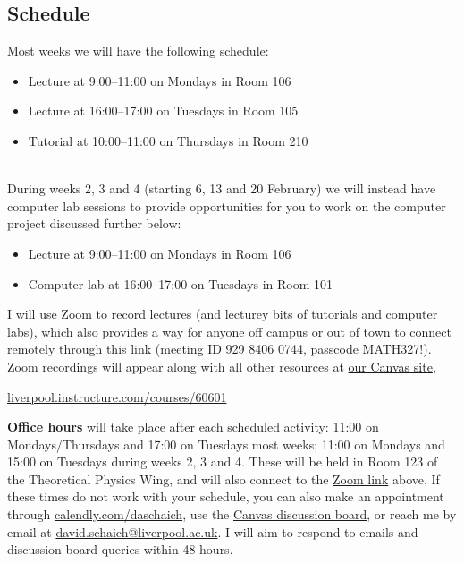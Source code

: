 \subsection*{Schedule}
Most weeks we will have the following schedule: \\[-30 pt]
\begin{itemize}
  \setlength{\itemsep}{1pt}
  \setlength{\parskip}{0pt}
  \setlength{\parsep}{0pt}
  \item Lecture at 9:00--11:00 on Mondays in Room 106
  \item Lecture at 16:00--17:00 on Tuesdays in Room 105
  \item Tutorial at 10:00–11:00 on Thursdays in Room 210
\end{itemize}
\ \\[-30 pt]
During weeks 2, 3 and 4 (starting 6, 13 and 20 February) we will instead have computer lab sessions to provide opportunities for you to work on the computer project discussed further below: \\[-30 pt]
\begin{itemize}
  \setlength{\itemsep}{1pt}
  \setlength{\parskip}{0pt}
  \setlength{\parsep}{0pt}
  \item Lecture at 9:00--11:00 on Mondays in Room 106
  \item Computer lab at 16:00--17:00 on Tuesdays in Room 101
\end{itemize}

I will use Zoom to record lectures (and lecturey bits of tutorials and computer labs), which also provides a way for anyone off campus or out of town to connect remotely through \href{https://liverpool-ac-uk.zoom.us/j/92984060744?pwd=WkVPek8ySlVGVmZVQXJSL21HTTd2Zz09}{this link} (meeting ID 929 8406 0744, passcode MATH327!).
Zoom recordings will appear along with all other resources at \href{https://liverpool.instructure.com/courses/60601}{our Canvas site}, \\
\centerline{\href{https://liverpool.instructure.com/courses/60601}{liverpool.instructure.com/courses/60601}}

\textbf{Office hours} will take place after each scheduled activity: 11:00 on Mondays/Thursdays and 17:00 on Tuesdays most weeks; 11:00 on Mondays and 15:00 on Tuesdays during weeks 2, 3 and 4.
These will be held in Room 123 of the Theoretical Physics Wing, and will also connect to the \href{https://liverpool-ac-uk.zoom.us/j/92984060744?pwd=WkVPek8ySlVGVmZVQXJSL21HTTd2Zz09}{Zoom link} above.
If these times do not work with your schedule, you can also make an appointment through \href{https://calendly.com/daschaich/meet}{calendly.com/daschaich}, use the \href{https://liverpool.instructure.com/courses/60601/discussion_topics}{Canvas discussion board}, or reach me by email at \href{mailto:david.schaich@liverpool.ac.uk}{david.schaich@liverpool.ac.uk}.
I will aim to respond to emails and discussion board queries within 48 hours.



